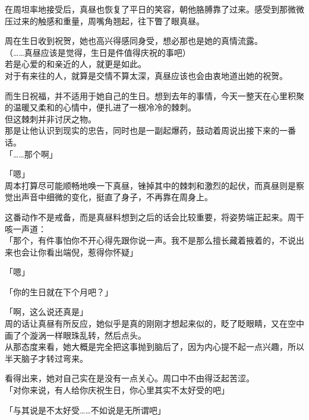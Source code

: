 在周坦率地接受后，真昼也恢复了平日的笑容，朝他胳膊靠了过来。感受到那微微压过来的触感和重量，周嘴角翘起，往下瞥了眼真昼。

周在生日收到祝贺，她也高兴得感同身受，想必那也是她的真情流露。\\

（……真昼应该是觉得，生日是件值得庆祝的事吧）\\

若是心爱的和亲近的人，就更是如此。\\

对于有来往的人，就算是交情不算太深，真昼应该也会由衷地道出她的祝贺。

而生日祝福，并不适用于她自己的生日。想到去年的事情，今天一整天在心里积聚的温暖又柔和的心情中，便扎进了一根冷冷的棘刺。\\

但这棘刺并非讨厌之物。\\

那是让他认识到现实的忠告，同时也是一副起爆药，鼓动着周说出接下来的一番话。\\

「……那个啊」

「嗯」\\

周本打算尽可能顺畅地唤一下真昼，锉掉其中的棘刺和激烈的起伏，而真昼则是察觉出声音中细微的变化，挺直了身子，不再靠在周身上。

这番动作不是戒备，而是真昼料想到之后的话会比较重要，将姿势端正起来。周干咳一声道：\\

「那个，有件事怕你不开心得先跟你说一声。我不是那么擅长藏着掖着的，不说出来也会让你看出端倪，惹得你怀疑」

「嗯」

「你的生日就在下个月吧？」

「啊，这么说还真是」\\

周的话让真昼有所反应，她似乎是真的刚刚才想起来似的，眨了眨眼睛，又在空中画了个漩涡一样眼珠乱转，然后点头。\\

从那态度来看，她大概是完全把这事抛到脑后了，因为内心提不起一点兴趣，所以半天脑子才转过弯来。

看得出来，她对自己实在是没有一点关心。周口中不由得泛起苦涩。\\

「对你来说，有人给你庆祝生日，你心里其实不太好受的吧」

「与其说是不太好受……不如说是无所谓吧」\\


